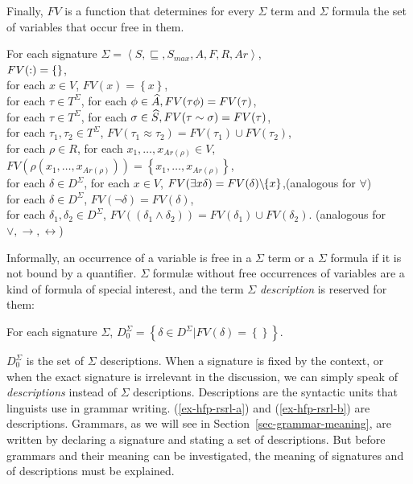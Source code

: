 \documentclass[output=paper
 	        ,biblatex
                ,babelshorthands
                ,newtxmath
                ,draftmode
                ,colorlinks, citecolor=brown
]{langscibook}
\begin{document}
{Finally, $FV$ is a function that determines for every $\Sigma$ term and
$\Sigma$ formula the set of variables that occur free in them.

\begin{mydef}
  For each signature $\Sigma=\left<S,\sqsubseteq,S_{max},A,F,R,Ar\right>$,\\
  $FV(\operatorname{:})=\left\{\right\}$,\\
  for each $x\in V$, $FV(x)=\left\{x\right\}$,\\
  for each $\tau\in T^{\Sigma}$, for each $\phi\in\widehat{A}, FV(\tau\phi)=FV(\tau)$,\\
  for each $\tau\in T^{\Sigma}$, for each $\sigma\in\widehat{S}, FV(\tau\sim\sigma)=FV(\tau)$,\\
  for each $\tau_1, \tau_2\in T^{\Sigma}$, $FV(\tau_1\approx\tau_2)=FV(\tau_1)\cup FV(\tau_2)$,\\
  for each $\rho\in R$, for each $x_1,\ldots, x_{Ar(\rho)}\in V$,\\
  \hspace*{.5cm} $FV(\rho(x_1,\ldots, x_{Ar(\rho)}))=\left\{x_1,\ldots, x_{Ar(\rho)}\right\}$,\\
  for each $\delta\in D^{\Sigma}$, for each $x\in V$,
  $FV(\exists x\delta)=FV(\delta)\backslash\hspace{-.25em}\left\{x \right\}$,\hfill(analogous for $\forall$)\\
  for each $\delta\in D^{\Sigma}$, $FV(\neg\delta)=FV(\delta)$,\\
  for each $\delta_1,\delta_2\in D^{\Sigma}$,
  $FV((\delta_1\land\delta_2))=FV(\delta_1)\cup FV(\delta_2)$.
  \hfill (analogous for $\lor,\rightarrow,\leftrightarrow$)
\end{mydef}

Informally, an occurrence of a variable is free in a $\Sigma$ term or a
$\Sigma$ formula if it is not bound by a quantifier.
$\Sigma$ formulæ without free occurrences of variables are a kind of formula
of special interest, and the term $\Sigma$ \emph{description} is reserved for them:

\begin{mydef}
  For each signature $\Sigma$,
  $D_0^{\Sigma}=\left\{\delta\in D^{\Sigma} | FV(\delta)=\left\{\right\}\right\}$.
\end{mydef}

\noindent
$D_0^{\Sigma}$ is the set of $\Sigma$ descriptions.
When a signature is fixed by the context, or when the exact signature is
irrelevant in the discussion, we can simply speak of \emph{descriptions}
instead of $\Sigma$ descriptions. Descriptions are the syntactic units
that linguists use in grammar writing. (\ref{ex-hfp-rsrl-a}) and (\ref{ex-hfp-rsrl-b}) are descriptions. Grammars, as we will see in
Section~\ref{sec-grammar-meaning}, are written by declaring a signature
and stating a set of descriptions. But before grammars and their meaning can
be investigated, the meaning of signatures and of descriptions must be explained.


}
\end{document}
